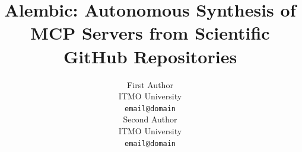 \documentclass[11pt]{article}
\title{Alembic: Autonomous Synthesis of MCP Servers from Scientific GitHub Repositories}
\author{
  First Author \\
  ITMO University \\
  \texttt{email@domain} \\\And
  Second Author \\
  ITMO University \\
  \texttt{email@domain} \\
}
\begin{document}
\maketitle

\begin{abstract}

\end{abstract}













\appendix

\end{document}
